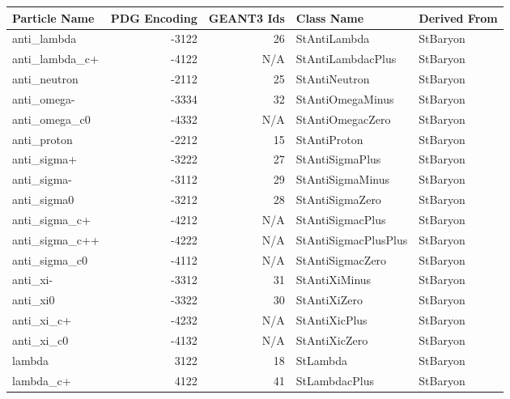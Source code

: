 \documentclass[twoside]{article}
\begin{document}
\begin{description}
\begin{table}[htb]
    \begin{center}
    \begin{tabular}{|l|r|r|l| l |}
        \hline
        \textbf{Particle Name} & \textbf{PDG Encoding} & \textbf{GEANT3 Ids}  & \textbf{Class Name} & \textbf{Derived From} \\ \hline
  anti\_lambda  & -3122 & 26    &         StAntiLambda  & StBaryon       \\ \hline
anti\_lambda\_c+  & -4122 & N/A   &    StAntiLambdacPlus  & StBaryon       \\ \hline
  anti\_neutron  & -2112 & 25    &        StAntiNeutron  & StBaryon       \\ \hline
   anti\_omega-  & -3334 & 32    &     StAntiOmegaMinus  & StBaryon       \\ \hline
 anti\_omega\_c0  & -4332 & N/A   &     StAntiOmegacZero  & StBaryon       \\ \hline
   anti\_proton  & -2212 & 15    &         StAntiProton  & StBaryon       \\ \hline
   anti\_sigma+  & -3222 & 27    &      StAntiSigmaPlus  & StBaryon       \\ \hline
   anti\_sigma-  & -3112 & 29    &     StAntiSigmaMinus  & StBaryon       \\ \hline
   anti\_sigma0  & -3212 & 28    &      StAntiSigmaZero  & StBaryon       \\ \hline
 anti\_sigma\_c+  & -4212 & N/A   &     StAntiSigmacPlus  & StBaryon       \\ \hline
anti\_sigma\_c++  & -4222 & N/A   & StAntiSigmacPlusPlus  & StBaryon       \\ \hline
 anti\_sigma\_c0  & -4112 & N/A   &     StAntiSigmacZero  & StBaryon       \\ \hline
      anti\_xi-  & -3312 & 31    &        StAntiXiMinus  & StBaryon       \\ \hline
      anti\_xi0  & -3322 & 30    &         StAntiXiZero  & StBaryon       \\ \hline
    anti\_xi\_c+  & -4232 & N/A   &        StAntiXicPlus  & StBaryon       \\ \hline
    anti\_xi\_c0  & -4132 & N/A   &        StAntiXicZero  & StBaryon       \\ \hline
        lambda  & 3122  & 18    &             StLambda  & StBaryon       \\ \hline
     lambda\_c+  & 4122  & 41    &        StLambdacPlus  & StBaryon       \\ \hline

\end{tabular}
\end{center}
\end{table}
\end{description}
\end{document}
